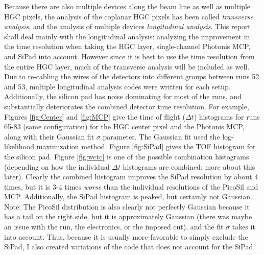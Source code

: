 \documentclass[12pt]{article}
\begin{document}
Because there are also multiple devices along the beam line as well as multiple HGC pixels, the analysis of the coplanar HGC pixels has been called \textit{transverse analysis}, and the analysis of multiple devices \textit{longitudinal analysis}. 
This report shall deal mainly with the longitudinal analysis: analyzing the improvement in the time resolution when taking the HGC layer, single-channel Photonis MCP, and SiPad into account. 
However since it is best to use the time resolution from the entire HGC layer, much of the transverse analysis will be included as well. 
Due to re-cabling the wires of the detectors into different groups between runs 52 and 53, multiple longitudinal analysis codes were written for each setup. 
Additionally, the silicon pad has noise dominating for most of the runs, and substantially deteriorates the combined detector time resolution. 
For example, Figures \ref{fig:Center} and \ref{fig:MCP} give the time of flight ($\Delta t$) histograms for runs 65-83 (same configuration) for the HGC center pixel and the Photonis MCP, along with their Gaussian fit $\sigma$ parameter. 
The Gaussian fit used the log-likelihood maximization method.
Figure \ref{fig:SiPad} gives the TOF histogram for the silicon pad. 
Figure \ref{fig:wctc} is one of the possible combination histograms (depending on how the individual $\Delta t$ histograms are combined; more about this later). 
Clearly the combined histogram improves the SiPad resolution by about 4 times, but it is 3-4 times \textit{worse} than the individual resolutions of the PicoSil and MCP. 
Additionally, the SiPad histogram is peaked, but certainly not Gaussian. 
Note: The PicoSil distribution is also clearly not perfectly Gaussian because it has a tail on the right side, but it is approximately Gaussian (there was maybe an issue with the run, the electronics, or the imposed cut), and the fit $\sigma$ takes it into account. 
Thus, because it is usually more favorable to simply exclude the SiPad, I also created variations of the code that does not account for the SiPad.
\end{document}
